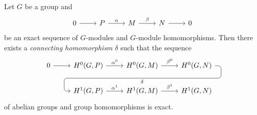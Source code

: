 \begin{theorem}
Let $G$ be a group and 
\[
\begin{tikzcd}
    0 & P & M & N & 0
    \arrow[from=1-1, to=1-2]
    \arrow["\alpha", from=1-2, to=1-3]
    \arrow["\beta", from=1-3, to=1-4]
    \arrow[from=1-4, to=1-5]
    \end{tikzcd}
\] 
be an exact sequence of $G$-modules and $G$-module homomorphisms. 
Then there exists a \emph{connecting homomorphism} $\delta$ such that the sequence 
\begin{equation}
\label{eq:long}
\begin{tikzcd}
 0\rar & H^0(G,P)\rar["\alpha^0"] & H^0(G,M) \rar["\beta^0"]
             \ar[draw=none]{d}[name=X, anchor=center]{}
    & H^0(G,N) \ar[rounded corners,
            to path={ -- ([xshift=2ex]\tikztostart.east)
                      |- (X.center) \tikztonodes
                      -| ([xshift=-2ex]\tikztotarget.west)
                      -- (\tikztotarget)}]{dll}[at end]{\delta} \\      
  &H^1(G,P) \rar["\alpha^1"] & H^1(G,M) \rar["\beta^1"] & H^1(G,N)
\end{tikzcd}
\end{equation}
of abelian groups
and group homomorphisms is exact. 
\end{theorem}

